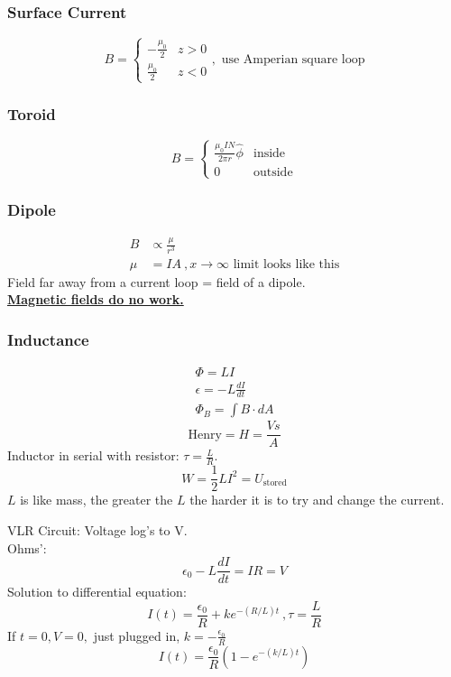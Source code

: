 \documentclass[10pt,letter]{article}
\begin{document}
\subsubsection{Surface Current}
\[
 B =
  \begin{cases}
   -\frac{\mu_0}{2}& z > 0\\
   \frac{\mu_0}{2}& z< 0
  \end{cases}, \textrm{ use Amperian square loop}
\]

\subsubsection{Toroid}
\[
 B =
  \begin{cases}
  \frac{\mu_0 IN}{2 \pi r} \hat{\phi} & \textrm{inside} \\
   0 & \textrm{outside}
  \end{cases}
\]

\subsubsection{Dipole}
\begin{align}
 B &\propto \frac{\mu}{r^3}\\
 \mu &= I A ~, x \rightarrow \infty \textrm{ limit looks like this}
\end{align}
Field far away from a current loop = field of a dipole.\\

\underline{\textbf{Magnetic fields do no work.}}

\subsubsection{Inductance}
\begin{align}
 \Phi = LI\\
 \epsilon = -L \frac{dI}{dt}\\
 \Phi_B = \int B \cdot dA
\end{align}
\begin{equation}
 \textrm{Henry} = H = \frac{Vs}{A}
\end{equation}
Inductor in serial with resistor: $\tau = \frac{L}{R}$.
\begin{equation}
 W = \frac{1}{2}LI^2 = U_{\textrm{stored}}
\end{equation}
$L$ is like mass, the greater the $L$ the harder it is to try and change the current.

VLR Circuit: Voltage log's to V.\\
Ohms':
\begin{equation}
 \epsilon_0 - L\frac{dI}{dt} = IR = V
\end{equation}
Solution to differential equation:
\begin{equation}
 I(t) = \frac{\epsilon_0}{R} + ke^{-(R/L)t}~,\tau = \frac{L}{R}
\end{equation}
If $t=0, V=0,$ just plugged in, $k = -\frac{\epsilon_0}{R}$
\begin{equation}
 I(t) = \frac{\epsilon_0}{R} \left( 1-e^{-(k/L)t} \right) 
\end{equation}
\end{document}
